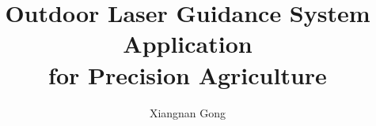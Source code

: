 \documentclass[ece,dissertation]{puthesis}
\title{Outdoor Laser Guidance System Application\\
  for Precision Agriculture}
\author{Xiangnan Gong}{Gong, Xiangnan}
\begin{document}
\volume




















%






%
\end{document}
